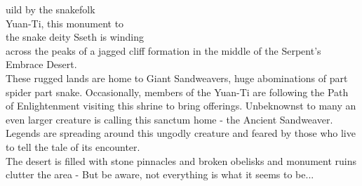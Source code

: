\entryfont \noindent {}uild by the snakefolk\\Yuan-Ti, this monument to\\the snake deity Sseth is winding\\across the peaks of a jagged cliff formation in the middle of the Serpent's Embrace Desert.\\ These rugged lands are home to Giant Sandweavers, huge abominations of part spider part snake. Occasionally, members of the Yuan-Ti are following the Path of Enlightenment visiting this shrine to bring offerings. Unbeknownst to many an even larger creature is calling this sanctum home - the Ancient Sandweaver. Legends are spreading around this ungodly creature and feared by those who live to tell the tale of its encounter.\\
The desert is filled with stone pinnacles and broken obelisks and monument ruins clutter the area - But be aware, not everything is what it seems to be...
	
